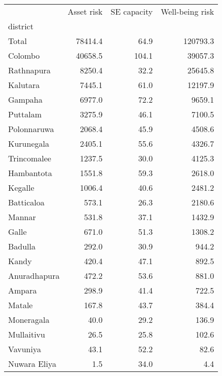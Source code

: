 \begin{tabular}{lrrr}
\toprule
{} &  Asset risk &  SE capacity &  Well-being risk \\
district     &             &              &                  \\
\midrule
Total        &     78414.4 &         64.9 &         120793.3 \\
Colombo      &     40658.5 &        104.1 &          39057.3 \\
Rathnapura   &      8250.4 &         32.2 &          25645.8 \\
Kalutara     &      7445.1 &         61.0 &          12197.9 \\
Gampaha      &      6977.0 &         72.2 &           9659.1 \\
Puttalam     &      3275.9 &         46.1 &           7100.5 \\
Polonnaruwa  &      2068.4 &         45.9 &           4508.6 \\
Kurunegala   &      2405.1 &         55.6 &           4326.7 \\
Trincomalee  &      1237.5 &         30.0 &           4125.3 \\
Hambantota   &      1551.8 &         59.3 &           2618.0 \\
Kegalle      &      1006.4 &         40.6 &           2481.2 \\
Batticaloa   &       573.1 &         26.3 &           2180.6 \\
Mannar       &       531.8 &         37.1 &           1432.9 \\
Galle        &       671.0 &         51.3 &           1308.2 \\
Badulla      &       292.0 &         30.9 &            944.2 \\
Kandy        &       420.4 &         47.1 &            892.5 \\
Anuradhapura &       472.2 &         53.6 &            881.0 \\
Ampara       &       298.9 &         41.4 &            722.5 \\
Matale       &       167.8 &         43.7 &            384.4 \\
Moneragala   &        40.0 &         29.2 &            136.9 \\
Mullaitivu   &        26.5 &         25.8 &            102.6 \\
Vavuniya     &        43.1 &         52.2 &             82.6 \\
Nuwara Eliya &         1.5 &         34.0 &              4.4 \\
\bottomrule
\end{tabular}
